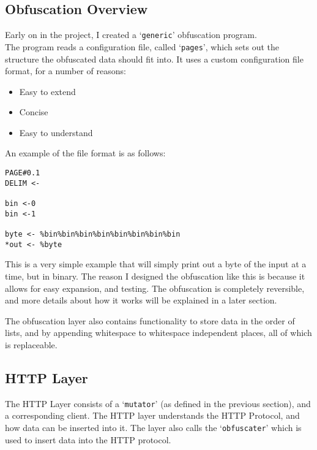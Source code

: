 \subsection{Obfuscation Overview}
Early on in the project, I created a `\texttt{generic}' obfuscation program.\\
The program reads a configuration file, called `\texttt{pages}', which sets out the structure the obfuscated data should fit into. It uses a custom configuration file format, for a number of reasons:
\begin{itemize}
    \item Easy to extend
    \item Concise
    \item Easy to understand
\end{itemize}
An example of the file format is as follows:
\begin{verbatim}
PAGE#0.1
DELIM <-

bin <-0
bin <-1 

byte <- %bin%bin%bin%bin%bin%bin%bin%bin
*out <- %byte
\end{verbatim}
This is a very simple example that will simply print out a byte of the input at a time, but in binary.
The reason I designed the obfuscation like this is because it allows for easy expansion, and testing.
The obfuscation is completely reversible, and more details about how it works will be explained in a later section.\par
The obfuscation layer also contains functionality to store data in the order of lists, and by appending whitespace to whitespace independent places, all of which is replaceable.

\subsection{HTTP Layer}
The HTTP Layer consists of a `\texttt{mutator}' (as defined in the previous section), and a corresponding client. The HTTP layer understands the HTTP Protocol, and how data can be inserted into it.
The layer also calls the `\texttt{obfuscater}' which is used to insert data into the HTTP protocol.

